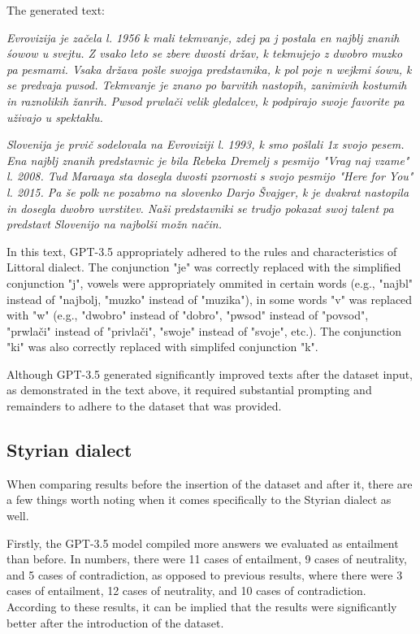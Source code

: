 \documentclass[fleqn,moreauthors,10pt]{ds_report}
\begin{document}
\vspace{\baselineskip}
The generated text: 

\textit{Evrovizija je začela l. 1956 k mali tekmvanje, zdej pa j postala en najblj znanih śowow u svejtu. Z vsako leto se zbere dwosti držav, k tekmujejo z dwobro muzko pa pesmami. Vsaka država pošle swojga predstavnika, k pol poje n wejkmi śowu, k se predvaja pwsod. Tekmvanje je znano po barvitih nastopih, zanimivih kostumih in raznolikih žanrih. Pwsod prwlači velik gledalcev, k podpirajo swoje favorite pa uživajo u spektaklu.}

\textit{Slovenija je prvič sodelovala na Evroviziji l. 1993, k smo pošlali 1x svojo pesem. Ena najblj znanih predstavnic je bila Rebeka Dremelj s pesmijo "Vrag naj vzame" l. 2008. Tud Maraaya sta dosegla dwosti pzornosti s svojo pesmijo "Here for You" l. 2015. Pa še polk ne pozabmo na slovenko Darjo Švajger, k je dvakrat nastopila in dosegla dwobro uvrstitev. Naši predstavniki se trudjo pokazat swoj talent pa predstavt Slovenijo na najbolši možn način.}

\vspace{\baselineskip}
In this text, GPT-3.5 appropriately adhered to the rules and characteristics of Littoral dialect. The conjunction "je" was correctly replaced with the simplified conjunction "j", vowels were appropriately ommited in certain words (e.g., "najbl" instead of "najbolj, "muzko" instead of "muzika"), in some words "v" was replaced with "w" (e.g., "dwobro" instead of "dobro", "pwsod" instead of "povsod", "prwlači" instead of "privlači", "swoje" instead of "svoje", etc.). The conjunction "ki" was also correctly replaced with simplifed conjunction "k". 

Although GPT-3.5 generated significantly improved texts after the dataset input, as demonstrated in the text above, it required substantial prompting and remainders to adhere to the dataset that was provided. 


\subsection{Styrian dialect}

When comparing results before the insertion of the dataset and after it, there are a few things worth noting when it comes specifically to the Styrian dialect as well.

Firstly, the GPT-3.5 model compiled more answers we evaluated as entailment than before. In numbers, there were 11 cases of entailment, 9 cases of neutrality, and 5 cases of contradiction, as opposed to previous results, where there were  3 cases of entailment, 12 cases of neutrality, and 10 cases of contradiction. According to these results, it can be implied that the results were significantly better after the introduction of the dataset. 
    
\end{document}
